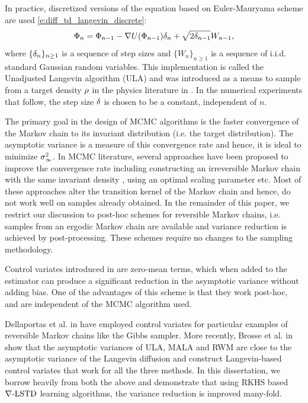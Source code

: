 In practice, discretized versions of the equation based on Euler-Mauryama scheme are used \eqref{e:diff_td_langevin_discrete}:
\begin{equation*}
\Phi_n = \Phi_{n-1} - \nabla U(\Phi_{n-1}) \delta_{n} + \sqrt{2  \delta_{n-1}} W_{n-1} ,
\end{equation*}
where $\{\delta_n\}_{n\geq 1}$ is a sequence of step sizes and $\{W_n\}_{n\geq 1}$ is a sequence of i.i.d. standard Gaussian random variables. This implementation is called the Unadjusted Langevin algorithm (ULA) and was introduced as a means to sample from a target density $\rho$ in the physics literature in \cite{par81}. In the numerical experiments that follow, the step size $\delta$ is chosen to be a constant, independent of $n$. 

The primary goal in the design of MCMC algorithms is the faster convergence of the Markov chain to its invariant distribution (i.e. the target distribution). The asymptotic variance is a measure of this convergence rate and hence, it is ideal to minimize $\sigma^2_\infty$. In MCMC literature, several approaches have been proposed to improve the convergence rate including constructing an irreversible Markov chain with the same invariant density \cite{hwanorwu15, dunlelpav16}, using an optimal scaling parameter \cite{robros01} etc. Most of these approaches alter the transition kernel of the Markov chain and hence, do not work well on samples already obtained. In the remainder of this paper, we restrict our discussion to post-hoc schemes for reversible Markov chains, i.e. samples from an ergodic Markov chain are available and variance reduction is achieved by post-processing. These schemes require no changes to the sampling methodology. 

Control variates introduced in \cite{HenThesis,henmeytad03a,kimhen07,ctcn} are zero-mean terms, which when added to the estimator can produce a significant reduction in the asymptotic variance without adding bias. One of the advantages of this scheme is that they work post-hoc, and are independent of the MCMC algorithm used. %

Dellaportas et al. in \cite{delkon12} have employed control variates for particular examples of reversible Markov chains like the Gibbs sampler.
More recently, Brosse et al. in \cite{brodurmeymou18} show that the asymptotic variances of ULA, MALA and RWM are close to the asymptotic variance of the Langevin diffusion and construct Langevin-based control variates that work for all the three methods. In this dissertation, we borrow heavily from both the above and demonstrate that using RKHS based $\nabla\text{-LSTD}$ learning algorithms, the variance reduction is improved many-fold. 


